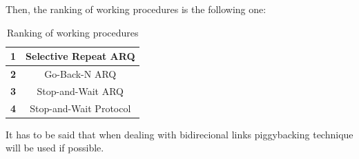 \documentclass[12pt,a4paper]{report}
\begin{document}
Then, the ranking of working procedures is the following one: 
\begin{table}[H]
\begin{center}
\begin{tabular}{|c|c|}
\hline
\textbf{1}&Selective Repeat ARQ\\
\hline
\textbf{2}&Go-Back-N ARQ\\
\hline
\textbf{3}&Stop-and-Wait ARQ\\
\hline
\textbf{4}&Stop-and-Wait Protocol\\
\hline
\end{tabular}
\caption{Ranking of working procedures}
\end{center}
\end{table}
It has to be said that when dealing with bidirecional links piggybacking technique will be used if possible.
\end{document}
